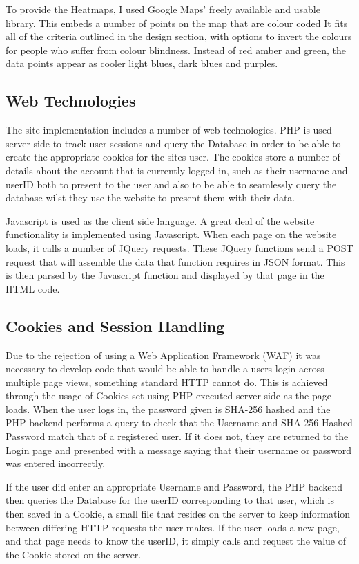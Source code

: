 \documentclass{l4proj}
\begin{document}
To provide the Heatmaps, I used Google Maps' freely  available and usable library. This embeds a number of points on the map that are colour coded  It fits all of the criteria outlined in the design section, with options to invert the colours for people who suffer from colour blindness. Instead of red amber and green, the data points appear as cooler light blues, dark blues and purples.

\subsection{Web Technologies}

The site implementation includes a number of web technologies. PHP is used server side to track user sessions and query the Database in order to be able to create the appropriate cookies for the sites user. The cookies store a number of details about the account that is currently logged in, such as their username and userID both to present to the user and also to be able to seamlessly query the database wilst they use the website to present them with their data.

Javascript is used as the client side language. A great deal of the website functionality is implemented using Javascript. When each page on the website loads, it calls a number of JQuery requests. These JQuery functions send a POST request that will assemble the data that function requires in JSON format. This is then parsed by the Javascript function and displayed by that page in the HTML code.

\subsection{Cookies and Session Handling}

Due to the rejection of using a Web Application Framework (WAF) it was necessary to develop code that would be able to handle a users login across multiple page views, something standard HTTP cannot do. This is achieved through the usage of Cookies set using PHP executed server side as the page loads. When the user logs in, the password given is SHA-256 hashed and the PHP backend performs a query to check that the Username and SHA-256 Hashed Password match that of a registered user. If it does not, they are returned to the Login page and presented with a message saying that their username or password was entered incorrectly. 

If the user did enter an appropriate Username and Password, the PHP backend then queries the Database for the userID corresponding to that user, which is then saved in a Cookie, a small file that resides on the server to keep information between differing HTTP requests the user makes. If the user loads a new page, and that page needs to know the userID, it simply calls and request the value of the Cookie stored on the server.
\end{document}
